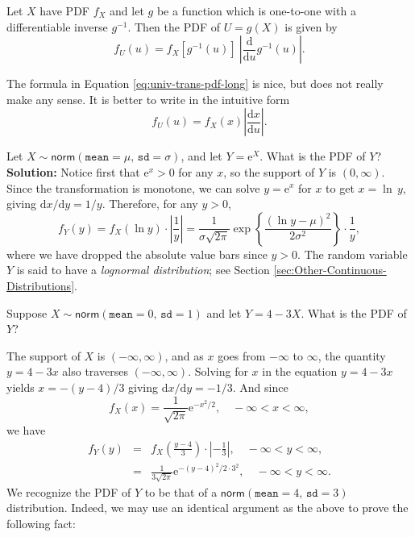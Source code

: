 \documentclass[captions=tableheading]{scrbook}
\begin{document}
\begin{prop}
\label{pro:func-cont-rvs-pdf-formula}

Let \(X\) have PDF \(f_{X}\) and let \(g\) be a function which is one-to-one with a differentiable inverse \(g^{-1}\). Then the PDF of \(U=g(X)\) is given by
\begin{equation}
f_{U}(u)=f_{X}\left[g^{-1}(u)\right]\ \left|\frac{\mathrm{d}}{\mathrm{d} u}g^{-1}(u)\right|.\label{eq:univ-trans-pdf-long}
\end{equation}
\end{prop}

\begin{rem}
The formula in Equation \ref{eq:univ-trans-pdf-long} is nice, but does not really make any sense. It is better to write in the intuitive form
\begin{equation}
f_{U}(u)=f_{X}(x)\left|\frac{\mathrm{d} x}{\mathrm{d} u}\right|.\label{eq:univ-trans-pdf-short}
\end{equation}
\end{rem}


\begin{example}
\label{exa:lnorm-transformation}
Let \(X\sim\mathsf{norm}(\mathtt{mean}=\mu,\,\mathtt{sd}=\sigma)\), and let \(Y=\mathrm{e}^{X}\). What is the PDF of \(Y\)? 
\textbf{Solution:} Notice first that \(\mathrm{e}^{x}>0\) for any \(x\), so the support of \(Y\) is \((0,\infty)\). Since the transformation is monotone, we can solve \(y=\mathrm{e}^{x}\) for \(x\) to get \(x=\ln\, y\), giving \(\mathrm{d} x/\mathrm{d} y=1/y\). Therefore, for any \(y>0\),
\[
f_{Y}(y)=f_{X}(\ln y)\cdot\left|\frac{1}{y}\right|=\frac{1}{\sigma\sqrt{2\pi}}\exp\left\{ \frac{(\ln y-\mu)^{2}}{2\sigma^{2}}\right\} \cdot\frac{1}{y},
\]
where we have dropped the absolute value bars since \(y>0\). The random variable \(Y\) is said to have a \emph{lognormal distribution}; see Section \ref{sec:Other-Continuous-Distributions}.
\end{example}

\begin{example}
\label{exa:lin-trans-norm}
Suppose \(X\sim\mathsf{norm}(\mathtt{mean}=0,\,\mathtt{sd}=1)\) and let \(Y=4-3X\). What is the PDF of \(Y\)?
\end{example}

The support of \(X\) is \((-\infty,\infty)\), and as \(x\) goes from \(-\infty\) to \(\infty\), the quantity \(y=4-3x\) also traverses \((-\infty,\infty)\). Solving for \(x\) in the equation \(y=4-3x\) yields \(x=-(y-4)/3\) giving \(\mathrm{d} x/\mathrm{d} y=-1/3\). And since
\[
f_{X}(x)=\frac{1}{\sqrt{2\pi}}\mathrm{e}^{-x^{2}/2},\quad-\infty<x<\infty,
\]
we have
\begin{eqnarray*}
f_{Y}(y) & = & f_{X}\left(\frac{y-4}{3}\right)\cdot\left|-\frac{1}{3}\right|,\quad-\infty<y<\infty,\\
 & = & \frac{1}{3\sqrt{2\pi}}\mathrm{e}^{-(y-4)^{2}/2\cdot3^{2}},\quad-\infty<y<\infty.
\end{eqnarray*}
We recognize the PDF of \(Y\) to be that of a \(\mathsf{norm}(\mathtt{mean}=4,\,\mathtt{sd}=3)\) distribution. Indeed, we may use an identical argument as the above to prove the following fact:
\end{document}
